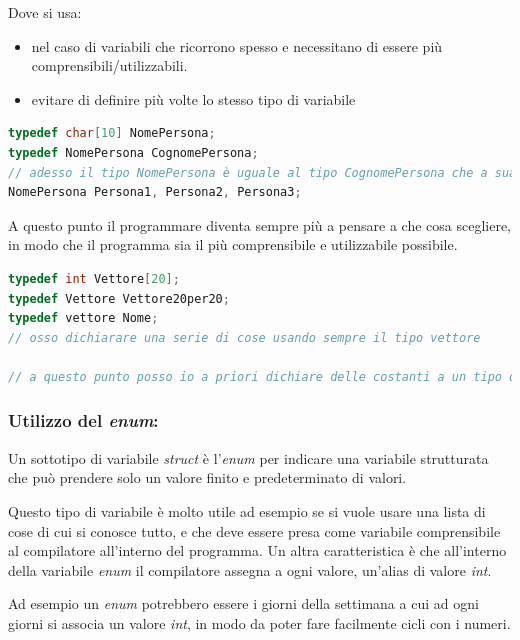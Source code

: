 \documentclass[
  paper=a4,
  oneside  ,captions=tableheading
]{scrbook}
\providecommand{\tightlist}{%
  \setlength{\itemsep}{0pt}\setlength{\parskip}{0pt}}
\begin{document}
Dove si usa:

\begin{itemize}
\tightlist
\item
  nel caso di variabili che ricorrono spesso e necessitano di essere più
  comprensibili/utilizzabili.
\item
  evitare di definire più volte lo stesso tipo di variabile
\end{itemize}

\begin{lstlisting}[language=C]
typedef char[10] NomePersona;
typedef NomePersona CognomePersona;
// adesso il tipo NomePersona è uguale al tipo CognomePersona che a sua volta è uguale a dire char[10]. Ma allo stesso modo posso anche dichiarare:
NomePersona Persona1, Persona2, Persona3;
\end{lstlisting}

A questo punto il programmare diventa sempre più a pensare a che cosa
scegliere, in modo che il programma sia il più comprensibile e
utilizzabile possibile.

\begin{lstlisting}[language=C]
typedef int Vettore[20];
typedef Vettore Vettore20per20;
typedef vettore Nome;
// osso dichiarare una serie di cose usando sempre il tipo vettore

// a questo punto posso io a priori dichiare delle costanti a un tipo di dato in modo che mi venga più comodo il suo uso.
\end{lstlisting}

\hypertarget{utilizzo-del-enum}{%
\subsubsection{\texorpdfstring{Utilizzo del
\emph{enum}:}{Utilizzo del enum:}}\label{utilizzo-del-enum}}

Un sottotipo di variabile \emph{struct} è l'\emph{enum} per indicare una
variabile strutturata che può prendere solo un valore finito e
predeterminato di valori.

Questo tipo di variabile è molto utile ad esempio se si vuole usare una
lista di cose di cui si conosce tutto, e che deve essere presa come
variabile comprensibile al compilatore all'interno del programma. Un
altra caratteristica è che all'interno della variabile \emph{enum} il
compilatore assegna a ogni valore, un'alias di valore \emph{int}.

Ad esempio un \emph{enum} potrebbero essere i giorni della settimana a
cui ad ogni giorni si associa un valore \emph{int}, in modo da poter
fare facilmente cicli con i numeri.
\end{document}
